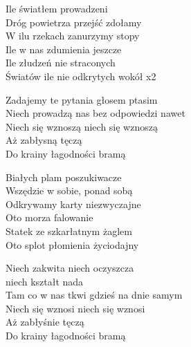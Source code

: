 
\begin{textn}
    \ifchorded{\hfill\break}
    Ile światłem prowadzeni\\
    Dróg powietrza przejść zdołamy\\
    W ilu rzekach zanurzymy stopy\\
    Ile w nas zdumienia jeszcze\\
    Ile złudzeń nie straconych\\
    Światów ile nie odkrytych wokół x2

    Zadajemy te pytania głosem ptasim\\
    Niech prowadzą nas bez odpowiedzi nawet\\
    Niech się wznoszą niech się wznoszą\\
    Aż zabłysną tęczą\\
    Do krainy łagodności bramą

    \ifchorded{\hfill\break}
    Białych plam poszukiwacze\\
    Wszędzie w sobie, ponad sobą\\
    Odkrywamy karty niezwyczajne\\
    Oto morza falowanie\\
    Statek ze szkarłatnym żaglem\\
    Oto splot płomienia życiodajny

    Niech zakwita niech oczyszcza\\
    niech kształt nada\\
    Tam co w nas tkwi gdzieś na dnie samym\\
    Niech się wznosi niech się wznosi\\
    Aż zabłyśnie tęczą\\
    Do krainy łagodności bramą
\end{textn}
